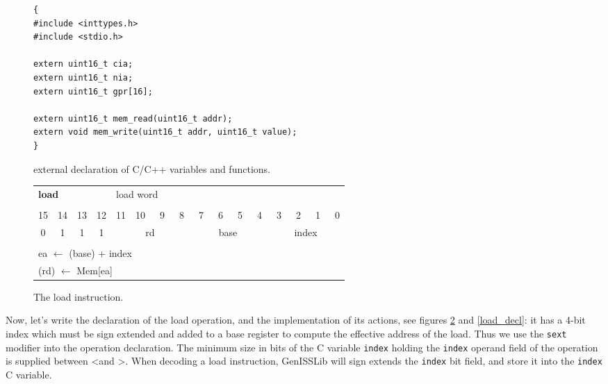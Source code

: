 \begin{figure}[ht]
\begin{center}
\begin{verbatim}
{
#include <inttypes.h>
#include <stdio.h>

extern uint16_t cia;
extern uint16_t nia;
extern uint16_t gpr[16];

extern uint16_t mem_read(uint16_t addr);
extern void mem_write(uint16_t addr, uint16_t value);
}
\end{verbatim}
\caption{external declaration of C/C++ variables and functions.}
\label{c_decl}
\end{center}
\end{figure}

\begin{figure}[h!tb]
\begin{center}
	\begin{tabular}{cccccccccccccccc}
		\multicolumn{4}{l}{\Large{\bf{load}}} & \multicolumn{12}{l}{load word}\\
		\multicolumn{16}{c}{}\\
		15  &  14  &  13  &  12  &  11  &  10  &  ~9  & ~8  &  ~7  &  ~6  &  ~5  &  ~4  &  ~3  &  ~2  &  ~1  &  ~0 \\
		\hline
		\multicolumn{1}{|c|}{0}  & \multicolumn{1}{|c|}{1} & \multicolumn{1}{|c|}{1} & \multicolumn{1}{|c|}{1} & \multicolumn{4}{|c|}{rd} & \multicolumn{4}{|c|}{base} & \multicolumn{4}{|c|}{index}\\
		\hline
		\multicolumn{16}{c}{}\\
		\multicolumn{16}{l}{ea $\leftarrow$ (base) + index}\\
		\multicolumn{16}{l}{(rd) $\leftarrow$ Mem[ea]}\\
	\end{tabular}
\end{center}
\caption{The load instruction.}
\label{load_instr}
\end{figure}

Now, let's write the declaration of the load operation, and the implementation of its actions, see figures \ref{load_instr} and \ref{load_decl}: it has a 4-bit index which
must be sign extended and added to a base register to compute the effective address of the load.
Thus we use the \texttt{sext} modifier into the operation declaration. The minimum size in bits of the C variable \texttt{index} holding the \texttt{index} operand field of the operation is supplied between \textless and \textgreater. When decoding a load instruction, GenISSLib will sign extends the \texttt{index} bit field, and store it into the \texttt{index} C variable.

